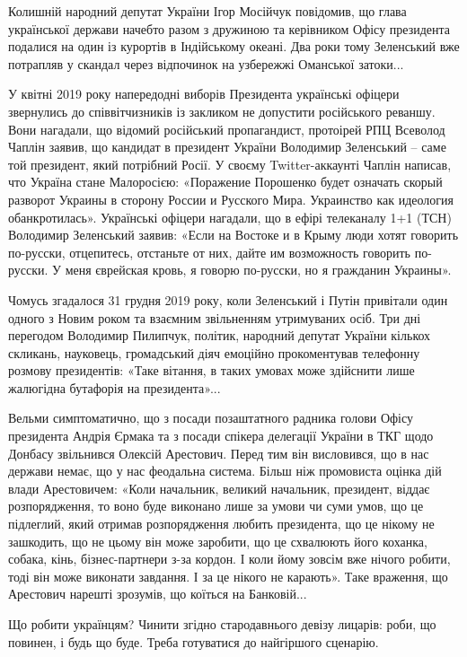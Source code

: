 Колишній народний депутат України Ігор Мосійчук повідомив, що глава української
держави начебто разом з дружиною та керівником Офісу президента подалися на
один із курортів в Індійському океані. Два роки тому Зеленський вже потрапляв у
скандал через відпочинок на узбережжі Оманської затоки...

У квітні 2019 року напередодні виборів Президента українські офіцери звернулись
до співвітчизників із закликом не допустити російського реваншу. Вони нагадали,
що відомий російський пропагандист, протоірей РПЦ Всеволод Чаплін заявив, що
кандидат в президент України Володимир Зеленський – саме той президент, який
потрібний Росії. У своєму Twitter-аккаунті Чаплін написав, что Україна стане
Малоросією: «Поражение Порошенко будет означать скорый разворот Украины в
сторону России и Русского Мира. Украинство как идеология обанкротилась».
Українські офіцери нагадали, що в ефірі телеканалу 1+1 (ТСН) Володимир
Зеленський заявив: «Если на Востоке и в Крыму люди хотят говорить по-русски,
отцепитесь, отстаньте от них, дайте им возможность говорить по-русски. У меня
єврейская кровь, я говорю по-русски, но я гражданин Украины».

Чомусь згадалося 31 грудня 2019 року, коли Зеленський і Путін привітали один
одного з Новим роком та взаємним звільненням утримуваних осіб. Три дні
перегодом Володимир Пилипчук, політик, народний депутат України кількох
скликань, науковець, громадський діяч емоційно прокоментував телефонну розмову
президентів: «Таке вітання, в таких умовах може здійснити лише жалюгідна
бутафорія на президента»...

Вельми симптоматично, що з посади позаштатного радника голови Офісу президента
Андрія Єрмака та з посади спікера делегації України в ТКГ щодо Донбасу
звільнився Олексій Арестович. Перед тим він висловився, що в нас держави немає,
що у нас феодальна система. Більш ніж промовиста оцінка дій влади Арестовичем:
«Коли начальник, великий начальник, президент, віддає розпорядження, то воно
буде виконано лише за умови чи суми умов, що це підлеглий, який отримав
розпорядження любить президента, що це нікому не зашкодить, що не цьому він
може заробити, що це схвалюють його коханка, собака, кінь, бізнес-партнери з-за
кордон. І коли йому зовсім вже нічого робити, тоді він може виконати завдання.
І за це нікого не карають». Таке враження, що Арестович нарешті зрозумів, що
коїться на Банковій...

Що робити українцям? Чинити згідно стародавнього девізу лицарів: роби, що
повинен, і будь що буде. Треба готуватися до найгіршого сценарію.

